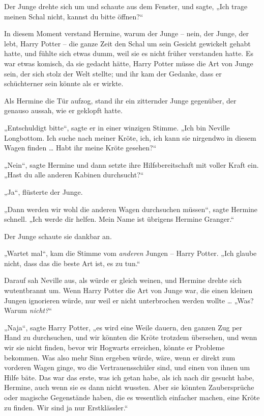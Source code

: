 Der Junge drehte sich um und schaute aus dem Fenster, und sagte, „Ich trage meinen Schal nicht, kannst du bitte öffnen?“ 

In diesem Moment verstand Hermine, warum der Junge – nein, der Junge, der lebt, Harry Potter – die ganze Zeit den Schal um sein Gesicht gewickelt gehabt hatte, und fühlte sich etwas dumm, weil sie es nicht früher verstanden hatte. Es war etwas komisch, da sie gedacht hätte, Harry Potter müsse die Art von Junge sein, der sich stolz der Welt stellte; und ihr kam der Gedanke, dass er schüchterner sein könnte als er wirkte. 

Als Hermine die Tür aufzog, stand ihr ein zitternder Junge gegenüber, der genauso aussah, wie er geklopft hatte. 

„Entschuldigt bitte“, sagte er in einer winzigen Stimme. „Ich bin Neville Longbottom. Ich suche nach meiner Kröte, ich, ich kann sie nirgendwo in diesem Wagen finden … Habt ihr meine Kröte gesehen?“ 

„Nein“, sagte Hermine und dann setzte ihre Hilfsbereitschaft mit voller Kraft ein. „Hast du alle anderen Kabinen durchsucht?“ 

„Ja“, flüsterte der Junge. 

„Dann werden wir wohl die anderen Wagen durchsuchen müssen“, sagte Hermine schnell. „Ich werde dir helfen. Mein Name ist übrigens Hermine Granger.“ 

Der Junge schaute sie dankbar an. 

„Wartet mal“, kam die Stimme vom \emph{anderen} Jungen – Harry Potter. „Ich glaube nicht, dass das die beste Art ist, es zu tun.“ 

Darauf sah Neville aus, als würde er gleich weinen, und Hermine drehte sich wutentbrannt um. Wenn Harry Potter die Art von Junge war, die einen kleinen Jungen ignorieren würde, nur weil er nicht unterbrochen werden wollte … „Was? Warum \emph{nicht?}“ 

„Naja“, sagte Harry Potter, „es wird eine Weile dauern, den ganzen Zug per Hand zu durchsuchen, und wir könnten die Kröte trotzdem übersehen, und wenn wir sie nicht finden, bevor wir Hogwarts erreichen, könnte er Probleme bekommen. Was also mehr Sinn ergeben würde, wäre, wenn er direkt zum vorderen Wagen ginge, wo die Vertrauensschüler sind, und einen von ihnen um Hilfe bäte. Das war das erste, was ich getan habe, als ich nach dir gesucht habe, Hermine, auch wenn sie es dann nicht wussten. Aber sie könnten Zaubersprüche oder magische Gegenstände haben, die es wesentlich einfacher machen, eine Kröte zu finden. Wir sind ja nur Erstklässler.“ 

